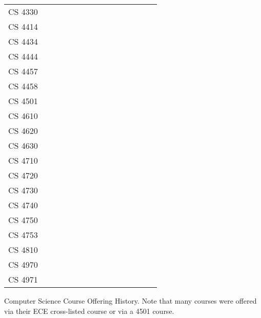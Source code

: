 {\begin{tabular}{l|cccccccccccccc}
CS 4330 &    & \X &    &    &    &    &    &    &    &    &    &    &    \\
CS 4414 & \X & \X & \X & \X & \X & \X & \X & \X & \X & \X & \X & \X & \X \\
CS 4434 &    &    &    & \X &    &    &    & \X &    &    &    &    &    \\
CS 4444 & \X &    & \X &    & \X &    & \X &    &    & \X &    &    &    \\
CS 4457 & \X & \X & \X & \X & \X & \X & \X & \X & \X & \X & \X &    & \X \\
CS 4458 & \X &    &    &    &    &    &    &    &    &    &    &    &    \\
CS 4501 &    &    &    &    & \X & \X &    &    & \X & \X &    & \X & \X \\
CS 4610 &    &    & \X &    &    &    &    & \X &    &    &    & \X &    \\
CS 4620 &    &    &    &    &    &    &    &    &    &    & \X &    & \X \\
CS 4630 &    & \X & \X & \X &    & \X &    & \X &    & \X & \X & \X &    \\
CS 4710 &    & \X &    &    &    & \X &    & \X &    & \X &    & \X &    \\
CS 4720 &    &    & \X &    & \X &    & \X &    & \X &    & \X & \X & \X \\
CS 4730 &    &    &    & \X &    &    & \X &    &    &    &    & \X &    \\
CS 4740 &    &    &    &    &    &    &    & \X &    & \X &    &    &    \\
CS 4750 & \X &    &    & \X &    & \X &    & \X &    & \X &    & \X &    \\
CS 4753 & \X &    & \X &    & \X &    & \X &    & \X &    & \X &    & \X \\
CS 4810 & \X &    &    & \X &    &    & \X &    & \X &    &    & \X & \X \\
CS 4970 &    &    &    &    &    &    &    & \X & \X &    & \X &    & \X \\
CS 4971 &    &    &    &    &    &    &    &    &    & \X &    & \X &    \\
\end{tabular}
}

\begin{table}[h!]
\begin{center}

{\resizebox{3.625in}{!}{\courseofferingtable}}
{\courseofferingtable}

\caption{Computer Science Course Offering History.  Note that many courses were offered via their ECE cross-listed course or via a 4501 course.}
\end{center}
\end{table}

